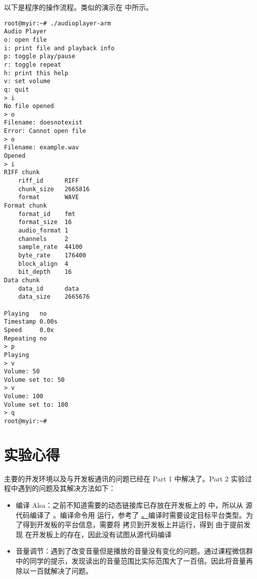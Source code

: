 以下是程序的操作流程。类似的演示在  中所示。

\begin{multicols}{2}
\begin{verbatim}
root@myir:~# ./audioplayer-arm
Audio Player
o: open file
i: print file and playback info
p: toggle play/pause
r: toggle repeat
h: print this help
v: set volume
q: quit
> i
No file opened
> o
Filename: doesnotexist
Error: Cannot open file
> o
Filename: example.wav
Opened
> i
RIFF chunk
    riff_id      RIFF
    chunk_size   2665816
    format       WAVE
Format chunk
    format_id    fmt
    format_size  16
    audio_format 1
    channels     2
    sample_rate  44100
    byte_rate    176400
    block_align  4
    bit_depth    16
Data chunk
    data_id      data
    data_size    2665676

Playing   no
Timestamp 0.00s
Speed     0.0x
Repeating no
> p
Playing
> v
Volume: 50
Volume set to: 50
> v
Volume: 100
Volume set to: 100
> q
root@myir:~#
\end{verbatim}
\end{multicols}

\newpage

\section{实验心得}\label{sec:problem}

主要的开发环境以及与开发板通讯的问题已经在 Part 1 中解决了。Part 2 实验过程中遇到的问题及其解决方法如下：

\begin{itemize}
    \item 编译 Alsa：之前不知道需要的动态链接库已存放在开发板上的  中，所以从  源代码编译了 。编译命令用  运行，参考了 \href{https://github.com/michaelwu/alsa-lib/blob/master/INSTALL}。编译时需要设定目标平台类型。为了得到开发板的平台信息，需要将  拷贝到开发板上并运行，得到 
    由于提前发现  在开发板上的存在，因此没有试图从源代码编译 
    \item 音量调节：遇到了改变音量但是播放的音量没有变化的问题。通过课程微信群中的同学的提示，发现读出的音量范围比实际范围大了一百倍。因此将音量再除以一百就解决了问题。
\end{itemize}
